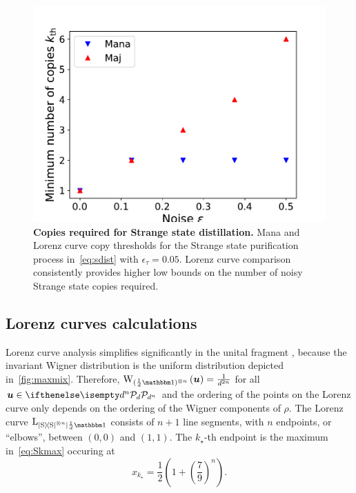 \documentclass[pra,
aps,
twocolumn,
superscriptaddress,
groupedaddress,
nofootinbib,
reprint
]{revtex4-1}
\begin{document}
\begin{figure}
    \centering
    \includegraphics[scale=0.5]{figs/unital_distill_copies.pdf}
    \caption{\textbf{Copies required for Strange state distillation.} Mana and Lorenz curve copy thresholds for the Strange state purification process in~\cref{eq:sdist} with $\epsilon_\tau = 0.05$.
    Lorenz curve comparison consistently provides higher low bounds on the number of noisy Strange state copies required.
    }
    \label{fig:unital_distill_copies}
\end{figure}

\newpage

\subsection{Lorenz curves calculations}

Lorenz curve analysis simplifies significantly in the unital fragment , because the invariant Wigner distribution is the uniform distribution depicted in~\cref{fig:maxmix}.
Therefore, $\W[\bmu]{(\frac{1}{d}\id)^{\otimes n}} = \frac{1}{d^{2n}}$ for all $\bmu \in \pd[d^n]$ and the ordering of the points on the Lorenz curve only depends on the ordering of the Wigner components of $\rho$.
The Lorenz curve $\lc{\ketbra{\rm{S}}^{\otimes n}}{\frac{1}{d}\id}$ consists of $n+1$ line segments, with $n$ endpoints, or ``elbows'', between $(0,0)$ and $(1,1)$. 
The $k_\star$-th endpoint is the maximum in~\cref{eq:Skmax} occuring at 
\begin{equation}
	x_{k_\star} = \frac{1}{2}\left(1 + \left( \frac{7}{9} \right)^n \right).
\end{equation}
\end{document}
